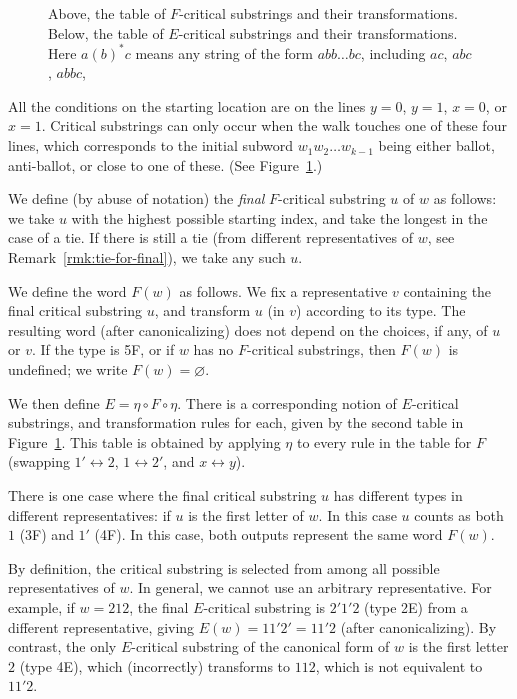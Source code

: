 \documentclass[ALCO,ThmDefs,Unicode,epreuves]{cedram}
\begin{document}
\begin{figure}[htb]
\caption{\label{fig:criticals} Above, the table of $F$-critical substrings and their transformations. Below, the table of $E$-critical substrings and their transformations. Here $a(b)^*c$ means any string of the form $abb \dots bc$, including $ac$, $abc$, $abbc$, \etc}
\end{figure}


\begin{rema} All the conditions on the starting location are on the lines $y=0$, $y=1$, $x=0$, or $x=1$. Critical substrings can only occur when the walk touches one of these four lines, which corresponds to the initial subword $w_1w_2 \dots w_{k-1}$ being either ballot, anti-ballot, or close to one of these. (See Figure~\ref{fig:criticals}.)
\end{rema}

We define (by abuse of notation) the \emph{final} $F$-critical substring $u$ of $w$ as follows: we take $u$ with the highest possible starting index, and take the longest in the case of a tie. If there is still a tie (from different representatives of $w$, see \eg Remark~\ref{rmk:tie-for-final}), we take any such $u$. 

\begin{defi}\label{def:F}
We define the word $F(w)$ as follows. We fix a representative $v$ containing the final critical substring $u$, and transform $u$ (in $v$) according to its type. The resulting word (\ie after canonicalizing) does not depend on the choices, if any, of $u$ or $v$. If the type is 5F, or if $w$ has no $F$-critical substrings, then $F(w)$ is undefined; we write $F(w) = \varnothing$.

We then define $E = \eta \circ F \circ \eta$. There is a corresponding notion of $E$-critical substrings, and transformation rules for each, given by the second table in Figure~\ref{fig:criticals}. This table is obtained by applying $\eta$ to every rule in the table
for $F$ (swapping $1' \leftrightarrow 2$, $1 \leftrightarrow 2'$, and $x \leftrightarrow y$).
\end{defi}

\begin{rema} \label{rmk:tie-for-final}
There is one case where the final critical substring $u$ has different types in different representatives: if $u$ is the first letter of $w$. In this case $u$ counts as both $1$ (3F) and $1'$ (4F). In this case, both outputs represent the same word $F(w)$.
\end{rema}

\begin{rema}
By definition, the critical substring is selected from among all possible representatives of $w$. In general, we cannot use an arbitrary representative. For example, if $w = 212$, the final $E$-critical substring is $2'1'2$ (type 2E) from a different representative, giving $E(w) = 11'2' = 11'2$ (after canonicalizing). By contrast, the only $E$-critical substring of the canonical form of $w$ is the first letter $2$ (type 4E), which (incorrectly) transforms to $112$, which is not equivalent to $11'2$.
\end{rema}
\end{document}
